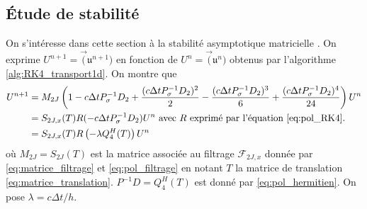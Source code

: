 \subsection{Étude de stabilité}

On s'intéresse dans cette section à la stabilité asymptotique matricielle \cite{Hirsch2007,Butcher2016}.
On exprime $U^{n+1} = \vec(\mathfrak{u}^{n+1})$ en fonction de $U^{n} = \vec(\mathfrak{u}^{n})$ obtenus par l'algorithme \ref{alg:RK4_transport1d}. On montre que
\begin{align*}
U^{n+1} & = M_{2J} \left( 1 - c \Delta t P_{\sigma}^{-1}D_2 + \dfrac{(c \Delta t P_{\sigma}^{-1}D_2)^2}{2} - \dfrac{(c \Delta t P_{\sigma}^{-1}D_2)^3}{6} + \dfrac{(c \Delta t P^{-1}_{\sigma}D_2)^4}{24} \right) U^n \\
		& = S_{2J,x}(T) R(- c \Delta t P_{\sigma}^{-1}D_2) U^n \text{ avec } R \text{ exprimé par l'équation \eqref{eq:pol_RK4}.}\\
		& = S_{2J,x}(T) R \left( -\lambda Q_{4}^H(T) \right) U^n
\end{align*}
où $M_{2J}=S_{2J}(T)$ est la matrice associée au filtrage $\mathcal{F}_{2J,x}$ donnée par \eqref{eq:matrice_filtrage} et \eqref{eq:pol_filtrage} en notant $T$ la matrice de translation \eqref{eq:matrice_translation}. $P^{-1}D = Q_4^H(T)$ est donné par \eqref{eq:pol_hermitien}. On pose $\lambda = c \Delta t / h$.

